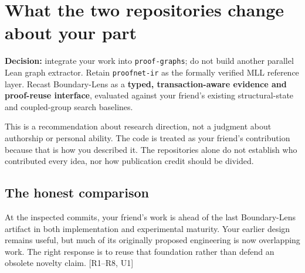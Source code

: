 \documentclass[
  10pt,
]{article}
\begin{document}
\section{What the two repositories change about your
part}\label{what-the-two-repositories-change-about-your-part}

\textbf{Decision:} integrate your work into \texttt{proof-graphs}; do
not build another parallel Lean graph extractor. Retain
\texttt{proofnet-ir} as the formally verified MLL reference layer.
Recast Boundary-Lens as a \textbf{typed, transaction-aware evidence and
proof-reuse interface}, evaluated against your friend's existing
structural-state and coupled-group search baselines.

This is a recommendation about research direction, not a judgment about
authorship or personal ability. The code is treated as your friend's
contribution because that is how you described it. The repositories
alone do not establish who contributed every idea, nor how publication
credit should be divided.

\subsection{The honest comparison}\label{the-honest-comparison}

At the inspected commits, your friend's work is ahead of the last
Boundary-Lens artifact in both implementation and experimental maturity.
Your earlier design remains useful, but much of its originally proposed
engineering is now overlapping work. The right response is to reuse that
foundation rather than defend an obsolete novelty claim. {[}R1--R8,
U1{]}
\end{document}
